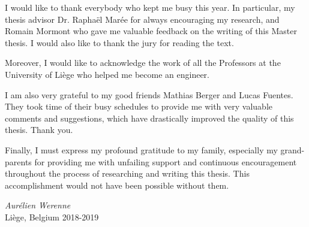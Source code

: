 \documentclass[
11pt, %
english, %
singlespacing, %
parskip, %
headsepline, %
]{master-thesis} %
\begin{document}
\begin{acknowledgements}
\addchaptertocentry{\acknowledgementname} %
\vspace*{5mm}
I would like to thank everybody who kept me busy this year. In particular, my thesis advisor Dr. Raphaël Marée for always encouraging my research, and Romain Mormont who gave me valuable feedback on the writing of this Master thesis. I would also like to thank the jury for reading the text.

Moreover, I would like to acknowledge the work of all the Professors at the University of Liège who helped me become an engineer.

I am also very grateful to my good friends Mathias Berger and Lucas Fuentes. They took time of their busy schedules to provide me with very valuable comments and suggestions, which have drastically improved the quality of this thesis. Thank you. 

Finally, I must express my profound gratitude to my family, especially my grand-parents for providing me with unfailing support and continuous encouragement throughout the process of researching and writing this thesis. This accomplishment would not have been possible without them.\\[1cm]

\begin{flushright}
\textit{Aurélien Werenne}\\
Liège, Belgium 2018-2019
\end{flushright}

\end{acknowledgements}


\tableofcontents %

\listoffigures %
\end{document}

